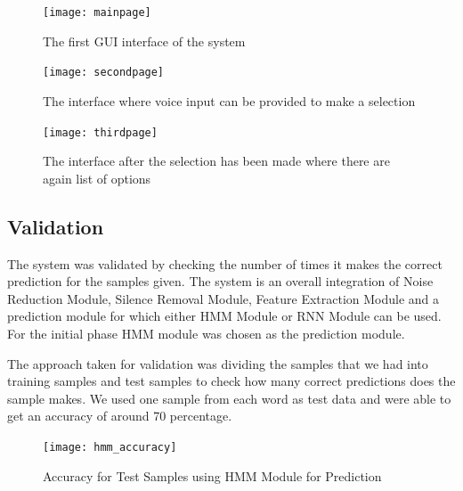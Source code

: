 \begin{figure}[H]
	\begin{center}
		
		\texttt{[image: mainpage]}
		\caption{The first GUI interface of the system}
	\end{center}
\end{figure}

\begin{figure}[H]
	\begin{center}
		
		\texttt{[image: secondpage]}
		\caption{The interface where voice input can be provided to make a selection}
	\end{center}
\end{figure}

\begin{figure}[H]
	\begin{center}
		
		\texttt{[image: thirdpage]}
		\caption{The interface after the selection has been made where there are again list of options}
	\end{center}
\end{figure}


\subsection{Validation}

The system was validated by checking the number of times it makes the correct prediction for the samples given. The system is an overall integration of Noise Reduction Module, Silence Removal Module, Feature Extraction Module and a prediction module for which either HMM Module or RNN Module can be used. For the initial phase HMM module was chosen as the prediction module.

The approach taken for validation was dividing the samples that we had into training samples and test samples to check how many correct predictions does the sample makes. We used one sample from each word as test data and were able to get an accuracy of around 70 percentage.

\begin{figure}[H]
	\begin{center}
		
		\texttt{[image: hmm\_accuracy]}
		\caption{Accuracy for Test Samples using HMM Module for Prediction}
	\end{center}
\end{figure}

